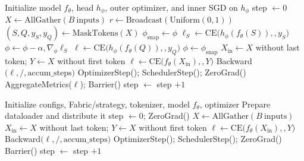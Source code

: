 \documentclass[11pt]{article}
\begin{document}
\begin{algorithm}\small \caption{Distributed SMLMT Loop}\label{alg:dist-maml} \begin{algorithmic} \State Initialize model $f_\theta$, head $h_\phi$, outer optimizer, and inner SGD on $h_\phi$ \State step $\leftarrow 0$  \State $X \leftarrow \text{AllGather}(B\ \text{inputs})$  \State $r \leftarrow \text{Broadcast}(\text{Uniform}(0,1))$  \State $(S,Q,y_S,y_Q) \leftarrow \text{MaskTokens}(X)$ \State $\phi_{\text{snap}} \leftarrow \phi$   \State $\ell_S \leftarrow \text{CE}\big(h_\phi(f_\theta(S)),,y_S\big)$ \State $\phi \leftarrow \phi - \alpha,\nabla_\phi \ell_S$ \EndFor \State $\ell \leftarrow \text{CE}\big(h_\phi(f_\theta(Q)),,y_Q\big)$ \State $\phi \leftarrow \phi_{\text{snap}}$  \Else \State $X_{\text{in}} \leftarrow X$ without last token; $Y \leftarrow X$ without first token \State $\ell \leftarrow \text{CE}\big(f_\theta(X_{\text{in}}),,Y\big)$ \EndIf \State Backward$\big(\ell ,/, \text{accum\_steps}\big)$  \State OptimizerStep(); SchedulerStep(); ZeroGrad() \State AggregateMetrics($\ell$); Barrier() \EndIf \State step $\leftarrow$ step $+ 1$ \EndFor \end{algorithmic} \end{algorithm}

\begin{algorithm}\small \caption{Distributed AR Loop}\label{alg:dist-ar} \begin{algorithmic} \State Initialize configs, Fabric/strategy, tokenizer, model $f_\theta$, optimizer \State Prepare dataloader and distribute it \State step $\leftarrow 0$; ZeroGrad()  \State $X \leftarrow \text{AllGather}(B\ \text{inputs})$  \State $X_{\text{in}} \leftarrow X$ without last token; $Y \leftarrow X$ without first token \State $\ell \leftarrow \text{CE}\big(f_\theta(X_{\text{in}}),,Y\big)$ \State Backward$\big(\ell ,/, \text{accum\_steps}\big)$  \State OptimizerStep(); SchedulerStep(); ZeroGrad() \State Barrier()  \EndIf \State step $\leftarrow$ step $+ 1$ \EndFor \end{algorithmic} \end{algorithm}


\newpage 
\end{document}

